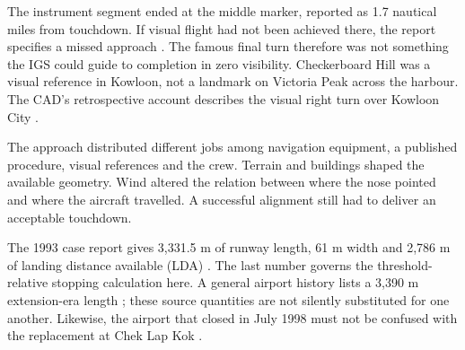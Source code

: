 The instrument segment ended at the middle marker, reported as 1.7 nautical miles from touchdown. If visual flight had not been achieved there, the report specifies a missed approach \cite[§1.8.1]{cad}. The famous final turn therefore was not something the IGS could guide to completion in zero visibility. Checkerboard Hill was a visual reference in Kowloon, not a landmark on Victoria Peak across the harbour. The CAD's retrospective account describes the visual right turn over Kowloon City \cite{cadlink}.

The approach distributed different jobs among navigation equipment, a published procedure, visual references and the crew. Terrain and buildings shaped the available geometry. Wind altered the relation between where the nose pointed and where the aircraft travelled. A successful alignment still had to deliver an acceptable touchdown.

The 1993 case report gives 3,331.5 m of runway length, 61 m width and 2,786 m of landing distance available (LDA) \cite[§1.10]{cad}. The last number governs the threshold-relative stopping calculation here. A general airport history lists a 3,390 m extension-era length \cite{cadhistory}; these source quantities are not silently substituted for one another. Likewise, the airport that closed in July 1998 must not be confused with the replacement at Chek Lap Kok \cite{cadlink}.

\clearpage
